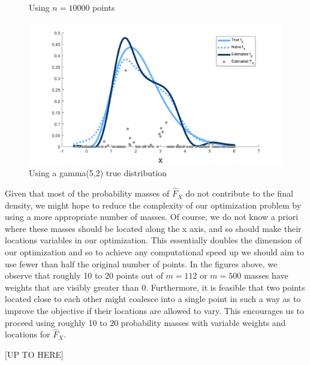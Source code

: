 \begin{figure}
\begin{minipage}{0.5\textwidth}
		\caption{Using $n = 10000$ points}
		\label{fig:fixed masses example n10000}
	\end{minipage}
	\begin{minipage}{0.5\textwidth}
		\centering
		\includegraphics[width = \textwidth]{Figures/Deconvolution/fixed_masses_example_Xgamma.png}
		\caption{Using a gamma(5,2) true distribution}
		\label{fig:fixed masses example Xgamma}
	\end{minipage}
\end{figure}

Given that most of the probability masses of $\hat{F}_X$ do not contribute to the final density, we might hope to reduce the complexity of our optimization problem by using a more appropriate number of masses. Of course, we do not know a priori where these masses should be located along the x axis, and so should make their locations variables in our optimization. This essentially doubles the dimension of our optimization and so to achieve any computational speed up we should aim to use fewer than half the original number of points. In the figures above, we observe that roughly 10 to 20 points out of $m = 112$ or $m = 500$ masses have weights that are visibly greater than 0. Furthermore, it is feasible that two points located close to each other might coalesce into a single point in such a way as to improve the objective if their locations are allowed to vary. This encourages us to proceed using roughly 10 to 20 probability masses with variable weights and locations for $\hat{F}_X$.

[UP TO HERE]

